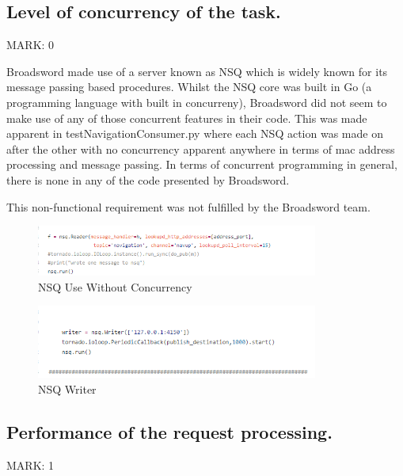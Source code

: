\documentclass{article}
\begin{document}
\subsection{Level of concurrency of the task.}
\begin{flushleft}
MARK: 0
\end{flushleft}

\begin{flushleft}
Broadsword made use of a server known as NSQ which is widely known for its message passing based procedures. Whilst the NSQ core was built in Go (a programming language with built in concurreny), Broadsword did not seem to make use of any of those concurrent features in their code. This was made apparent in testNavigationConsumer.py where each NSQ action was made on after the other with no concurrency apparent anywhere in terms of mac address processing and message passing. In terms of concurrent programming in general, there is none in any of the code presented by Broadsword. 
\end{flushleft}

\begin{flushleft}
This non-functional requirement was not fulfilled by the Broadsword team.
\end{flushleft}

\begin{figure}[ht]
  \includegraphics[width=350px]{Images/concurrency.PNG}
  \caption{NSQ Use Without Concurrency}
  \label{NSQ Use Without Concurrency}
\end{figure}

\begin{figure}[ht]
  \includegraphics[width=350px]{Images/concurrency2.PNG}
  \caption{NSQ Writer}
  \label{NSQ Writer}
\end{figure}

\subsection{Performance of the request processing.}
\begin{flushleft}
MARK: 1
\end{flushleft}
\end{document}
